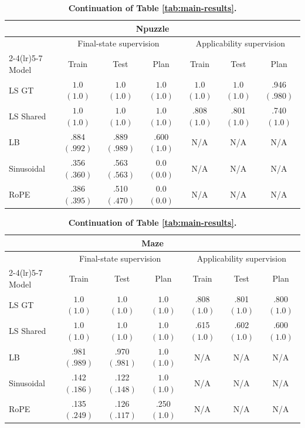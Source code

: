 \begin{table}[t]
\centering
\setlength{\tabcolsep}{4pt}
\caption{\textbf{Continuation of Table \ref{tab:main-results}.}}
\label{tab:main-results-cont}
\vspace{\baselineskip}

\begin{tabular*}{\linewidth}{@{\extracolsep{\fill}}lcccccc@{}}
\toprule
\multicolumn{7}{c}{\textbf{Npuzzle}} \\
\midrule
& \multicolumn{3}{c}{Final-state supervision} & \multicolumn{3}{c}{Applicability supervision} \\
\cmidrule(lr){2-4}\cmidrule(lr){5-7}
Model & Train & Test & Plan & Train & Test & Plan \\
\midrule
LS GT
& $\mathbf{1.0}$ $(\mathbf{1.0})$
& $\mathbf{1.0}$ $(\mathbf{1.0})$
& $\mathbf{1.0}$ $(\mathbf{1.0})$
& $\mathbf{1.0}$ $(\mathbf{1.0})$
& $\mathbf{1.0}$ $(\mathbf{1.0})$
& .946 $(.980)$ \\
LS Shared
& $\mathbf{1.0}$ $(\mathbf{1.0})$
& $\mathbf{1.0}$ $(\mathbf{1.0})$
& $\mathbf{1.0}$ $(\mathbf{1.0})$
& .808 $(\mathbf{1.0})$
& .801 $(\mathbf{1.0})$
& .740 $(\mathbf{1.0})$ \\
LB
& .884 $(.992)$
& .889 $(.989)$
& .600 $(\mathbf{1.0})$
& N/A
& N/A
& N/A \\
Sinusoidal
& .356 $(.360)$
& .563 $(.563)$
& 0.0 $(0.0)$
& N/A
& N/A
& N/A \\
RoPE
& .386 $(.395)$
& .510 $(.470)$
& 0.0 $(0.0)$
& N/A
& N/A
& N/A \\
\bottomrule
\end{tabular*}

\vspace{0.7em}

\begin{tabular*}{\linewidth}{@{\extracolsep{\fill}}lcccccc@{}}
\toprule
\multicolumn{7}{c}{\textbf{Maze}} \\
\midrule
& \multicolumn{3}{c}{Final-state supervision} & \multicolumn{3}{c}{Applicability supervision} \\
\cmidrule(lr){2-4}\cmidrule(lr){5-7}
Model & Train & Test & Plan & Train & Test & Plan \\
\midrule
LS GT
& $\mathbf{1.0}$ $(\mathbf{1.0})$
& $\mathbf{1.0}$ $(\mathbf{1.0})$
& $\mathbf{1.0}$ $(\mathbf{1.0})$
& .808 $(\mathbf{1.0})$
& .801 $(\mathbf{1.0})$
& .800 $(\mathbf{1.0})$ \\
LS Shared
& $\mathbf{1.0}$ $(\mathbf{1.0})$
& $\mathbf{1.0}$ $(\mathbf{1.0})$
& $\mathbf{1.0}$ $(\mathbf{1.0})$
& .615 $(\mathbf{1.0})$
& .602 $(\mathbf{1.0})$
& .600 $(\mathbf{1.0})$ \\
LB
& .981 $(.989)$
& .970 $(.981)$
& $\mathbf{1.0}$ $(\mathbf{1.0})$
& N/A
& N/A
& N/A \\
Sinusoidal
& .142 $(.186)$
& .122 $(.148)$
& $\mathbf{1.0}$ $(\mathbf{1.0})$
& N/A
& N/A
& N/A \\
RoPE
& .135 $(.249)$
& .126 $(.117)$
& .250 $(\mathbf{1.0})$
& N/A
& N/A
& N/A \\
\bottomrule
\end{tabular*}

\end{table}


